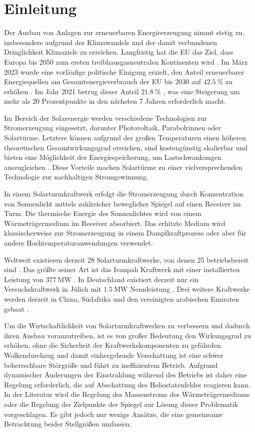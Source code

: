 \chapter{Einleitung} \label{ch_Einleitung}
Der Ausbau von Anlagen zur erneuerbaren Energieerzeugung nimmt stetig zu, insbesondere aufgrund des Klimawandels und der damit verbundenen Dringlichkeit Klimaziele zu erreichen.
Langfristig hat die EU das Ziel, dass Europa bis 2050 zum ersten treibhausgasneutralen Kontinenten wird \cite{Umweltbundesamt}.
Im März 2023 wurde eine vorläufige politische Einigung erzielt, den Anteil erneuerbarer Energiequellen am Gesamtenergieverbrauch der EU bis 2030 auf $\SI{42.5}{\percent}$ zu erhöhen \cite{RatEU}.
Im Jahr 2021 betrug dieser Anteil $\SI{21.8}{\percent}$ \cite{Destatis}, was eine Steigerung um mehr als 20 Prozentpunkte in den nächsten 7 Jahren erforderlich macht.

Im Bereich der Solarenergie werden verschiedene Technologien zur Stromerzeugung eingesetzt, darunter Photovoltaik, Parabolrinnen oder Solartürme.
Letztere können aufgrund der großen Temperaturen einen höheren theoretischen Gesamtwirkungsgrad erreichen, sind kostengünstig skalierbar und bieten eine Möglichkeit der Energiespeicherung, um Lastschwankungen auszugleichen \cite{Breeze}.
Diese Vorteile machen Solartürme zu einer vielversprechenden Technologie zur nachhaltigen Stromgewinnung.

In einem Solarturmkraftwerk erfolgt die Stromerzeugung durch Konzentration von Sonnenlicht mittels zahlreicher beweglicher Spiegel auf einen Receiver im Turm.
Die thermische Energie des Sonnenlichtes wird von einem Wärmeträgermedium im Receiver absorbiert.
Das erhitzte Medium wird klassischerweise zur Stromerzeugung in einem Dampfkraftprozess oder aber für andere Hochtemperaturanwendungen verwendet.

Weltweit existieren derzeit 28 Solarturmkraftwerke, von denen 25 betriebsbereit sind \cite{NREL1}.
Das größte seiner Art ist das Ivanpah Kraftwerk mit einer installierten Leistung von $\SI{377}{\mega\watt}$ \cite{NREL2}.
In Deutschland existiert derzeit nur ein Versuchskraftwerk in Jülich mit $\SI{1.5}{\mega\watt}$ Nennleistung \cite{NREL3}.
Drei weitere Kraftwerke werden derzeit in China, Südafrika und den vereinigten arabischen Emiraten gebaut \cite{NREL4}.

Um die Wirtschaftlichkeit von Solarturmkraftwerken zu verbessern und dadurch ihren Ausbau voranzutreiben, ist es von großer Bedeutung den Wirkungsgrad zu erhöhen, ohne die Sicherheit der Kraftwerkskomponenten zu gefährden.
Wolkendurchzug und damit einhergehende Verschattung ist eine schwer beherrschbare Störgröße und führt zu ineffizientem Betrieb.
Aufgrund dynamischer Änderungen der Einstrahlung während des Betriebs ist daher eine Regelung erforderlich, die auf Abschattung des Heliostatenfeldes reagieren kann.
In der Literatur wird die Regelung des Massenstroms des Wärmeträgermediums oder die Regelung der Zielpunkte der Spiegel zur Lösung dieser Problematik vorgeschlagen.
Es gibt jedoch nur wenige Ansätze, die eine gemeinsame Betrachtung beider Stellgrößen umfassen.


